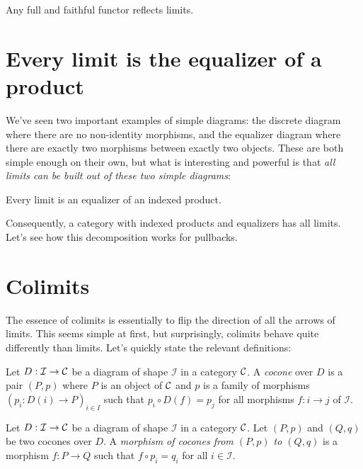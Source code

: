 \begin{proposition}
  Any full and faithful functor reflects limits.
\end{proposition}


\section{Every limit is the equalizer of a product}
We've seen two important examples of simple diagrams:
the discrete diagram where there are no non-identity morphisms,
and the equalizer diagram where there are exactly 
two morphisms between exactly two objects. 
These are both simple enough on their own, but what is 
interesting and powerful is that \emph{all limits can be 
built out of these two simple diagrams}:

\begin{theorem}
  Every limit is an equalizer of an indexed product.
\end{theorem}

Consequently, a category with indexed products and equalizers has all limits.
Let's see how this decomposition works for pullbacks.

\section{Colimits}
The essence of colimits is essentially to flip the direction of all the arrows
of limits. This seems simple at first, but surprisingly, colimits 
behave quite differently than limits. Let's quickly state the relevant 
definitions:

\begin{definition}[Cocone]
  \sloppy
  Let \(D : \mathcal I \to \mathcal C\) be a diagram of shape \(\mathcal I\)
  in a category \(\mathcal C\).
  A \emph{cocone} over \(D\) is a pair \((P,p)\)
  where \(P\) is an object of \(\mathcal C\)
  and \(p\) is a family of morphisms \((p_i : D(i) \to P)_{i\in I}\)
  such that \(p_i \circ D(f) = p_j\) for all morphisms \(f : i \to j\)
  of \(\mathcal I\).
\end{definition}

\begin{definition}
  Let \(D : \mathcal I \to \mathcal C\) be a diagram of shape \(\mathcal I\)
  in a category \(\mathcal C\).
  Let \((P,p)\) and \((Q,q)\) be two cocones over \(D\).
  A \emph{morphism of cocones from \((P,p)\) to \((Q,q)\)}
  is a morphism \(f : P \to Q\) such that \(f \circ p_i = q_i\)
  for all \(i \in \mathcal I\).
\end{definition}

